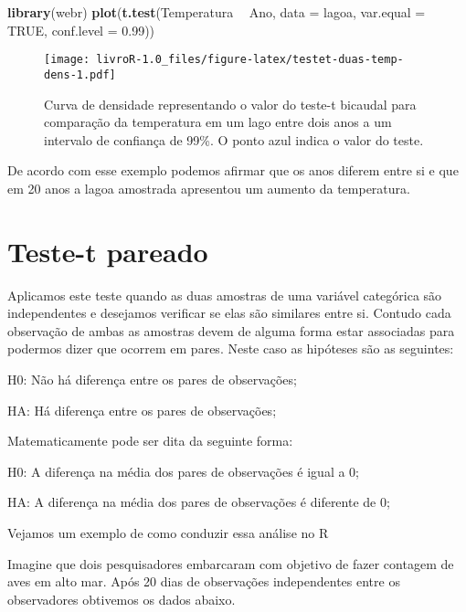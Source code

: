 \documentclass[]{book}
\newenvironment{Shaded}{\begin{snugshade}}{\end{snugshade}}
\newcommand{\DataTypeTok}[1]{\textcolor[rgb]{0.13,0.29,0.53}{#1}}
\newcommand{\FloatTok}[1]{\textcolor[rgb]{0.00,0.00,0.81}{#1}}
\newcommand{\KeywordTok}[1]{\textcolor[rgb]{0.13,0.29,0.53}{\textbf{#1}}}
\newcommand{\NormalTok}[1]{#1}
\newcommand{\OperatorTok}[1]{\textcolor[rgb]{0.81,0.36,0.00}{\textbf{#1}}}
\newcommand{\OtherTok}[1]{\textcolor[rgb]{0.56,0.35,0.01}{#1}}
\newcommand{\StringTok}[1]{\textcolor[rgb]{0.31,0.60,0.02}{#1}}
\begin{document}
\begin{Shaded}
\begin{Highlighting}[]
\KeywordTok{library}\NormalTok{(webr)}
\KeywordTok{plot}\NormalTok{(}\KeywordTok{t.test}\NormalTok{(Temperatura }\OperatorTok{~}\StringTok{ }\NormalTok{Ano, }
            \DataTypeTok{data =}\NormalTok{ lagoa,}
            \DataTypeTok{var.equal =} \OtherTok{TRUE}\NormalTok{,}
            \DataTypeTok{conf.level =} \FloatTok{0.99}\NormalTok{))}
\end{Highlighting}
\end{Shaded}

\begin{figure}
\centering
\texttt{[image: livroR-1.0\_files/figure-latex/testet-duas-temp-dens-1.pdf]}
\caption{\label{fig:testet-duas-temp-dens}Curva de densidade representando o valor do teste-t bicaudal para comparação da temperatura em um lago entre dois anos a um intervalo de confiança de 99\%. O ponto azul indica o valor do teste.}
\end{figure}

De acordo com esse exemplo podemos afirmar que os anos diferem entre si e que em 20 anos a lagoa amostrada apresentou um aumento da temperatura.

\hypertarget{teste-t-pareado}{%
\section{Teste-t pareado}\label{teste-t-pareado}}

Aplicamos este teste quando as duas amostras de uma variável categórica são independentes e desejamos verificar se elas são similares entre si. Contudo cada observação de ambas as amostras devem de alguma forma estar associadas para podermos dizer que ocorrem em pares. Neste caso as hipóteses são as seguintes:

H0: Não há diferença entre os pares de observações;

HA: Há diferença entre os pares de observações;

Matematicamente pode ser dita da seguinte forma:

H0: A diferença na média dos pares de observações é igual a 0;

HA: A diferença na média dos pares de observações é diferente de 0;

Vejamos um exemplo de como conduzir essa análise no R

Imagine que dois pesquisadores embarcaram com objetivo de fazer contagem de aves em alto mar. Após 20 dias de observações independentes entre os observadores obtivemos os dados abaixo.
\end{document}

